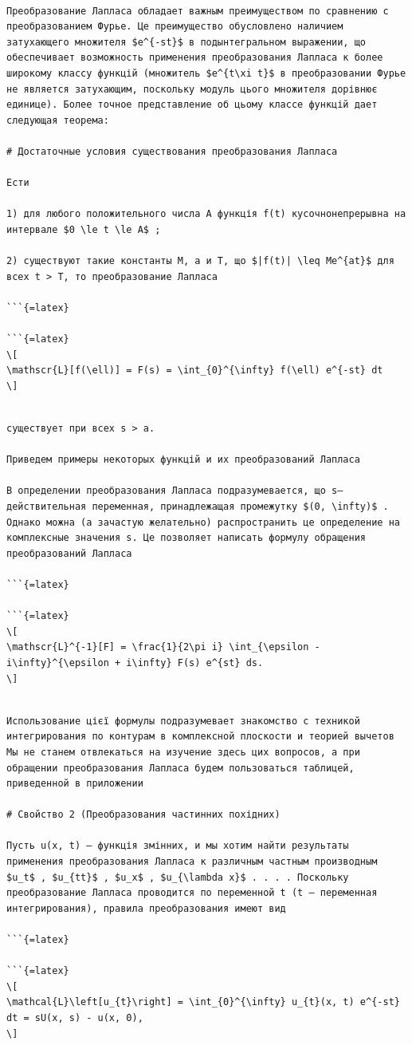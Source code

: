 \documentclass[
]{article}
\begin{document}
\begin{verbatim}

Преобразование Лапласа обладает важным преимуществом по сравнению с преобразованием Фурье. Це преимущество обусловлено наличием затухающего множителя $e^{-st}$ в подынтегральном выражении, що обеспечивает возможность применения преобразования Лапласа к более широкому классу функцій (множитель $e^{t\xi t}$ в преобразовании Фурье не является затухающим, поскольку модуль цього множителя дорівнює единице). Более точное представление об цьому классе функцій дает следующая теорема:

# Достаточные условия существования преобразования Лапласа

Ести

1) для любого положительного числа A функція f(t) кусочнонепрерывна на интервале $0 \le t \le A$ ;

2) существуют такие константы M, a и T, що $|f(t)| \leq Me^{at}$ для всех t > T, то преобразование Лапласа

```{=latex}

```{=latex}
\[
\mathscr{L}[f(\ell)] = F(s) = \int_{0}^{\infty} f(\ell) e^{-st} dt
\]
\end{verbatim}

\begin{verbatim}

существует при всех s > a.

Приведем примеры некоторых функцій и их преобразований Лапласа

В определении преобразования Лапласа подразумевается, що s—действительная переменная, принадлежащая промежутку $(0, \infty)$ . Однако можна (а зачастую желательно) распространить це определение на комплексные значения s. Це позволяет написать формулу обращения преобразований Лапласа

```{=latex}

```{=latex}
\[
\mathscr{L}^{-1}[F] = \frac{1}{2\pi i} \int_{\epsilon - i\infty}^{\epsilon + i\infty} F(s) e^{st} ds.
\]
\end{verbatim}

\begin{verbatim}

Использование цієї формулы подразумевает знакомство с техникой интегрирования по контурам в комплексной плоскости и теорией вычетов Мы не станем отвлекаться на изучение здесь цих вопросов, а при обращении преобразования Лапласа будем пользоваться таблицей, приведенной в приложении

# Свойство 2 (Преобразования частинних похідних)

Пусть u(x, t) — функція змінних, и мы хотим найти результаты применения преобразования Лапласа к различным частным производным $u_t$ , $u_{tt}$ , $u_x$ , $u_{\lambda x}$ . . . . Поскольку преобразование Лапласа проводится по переменной t (t — переменная интегрирования), правила преобразования имеют вид

```{=latex}

```{=latex}
\[
\mathcal{L}\left[u_{t}\right] = \int_{0}^{\infty} u_{t}(x, t) e^{-st} dt = sU(x, s) - u(x, 0),
\]
\end{verbatim}
\end{document}
